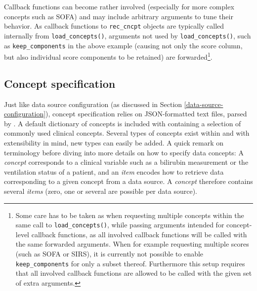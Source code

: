 \documentclass[
  notitle]{jss}
\begin{document}
Callback functions can become rather involved (especially for more
complex concepts such as SOFA) and may include arbitrary arguments to
tune their behavior. As callback functions to \texttt{rec\_cncpt}
objects are typically called internally from \texttt{load\_concepts()},
arguments not used by \texttt{load\_concepts()}, such as
\texttt{keep\_components} in the above example (causing not only the
score column, but also individual score components to be retained) are
forwarded\footnote{Some care has to be taken as when requesting multiple
  concepts within the same call to \texttt{load\_concepts()}, while
  passing arguments intended for concept-level callback functions, as
  all involved callback functions will be called with the same forwarded
  arguments. When for example requesting multiple scores (such as SOFA
  or SIRS), it is currently not possible to enable
  \texttt{keep\_components} for only a subset thereof. Furthermore this
  setup requires that all involved callback functions are allowed to be
  called with the given set of extra arguments.}.

\hypertarget{concept-specification}{%
\subsection{Concept specification}\label{concept-specification}}

Just like data source configuration (as discussed in Section
\ref{data-source-configuration}), concept specification relies on
JSON-formatted text files, parsed by  \citep{ooms2014}. A
default dictionary of concepts is included with  containing a
selection of commonly used clinical concepts. Several types of concepts
exist within  and with extensibility in mind, new types can
easily be added. A quick remark on terminology before diving into more
details on how to specify data concepts: A \emph{concept} corresponds to
a clinical variable such as a bilirubin measurement or the ventilation
status of a patient, and an \emph{item} encodes how to retrieve data
corresponding to a given concept from a data source. A \emph{concept}
therefore contains several \emph{items} (zero, one or several are
possible per data source).
\end{document}
